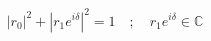 \documentclass[preview]{standalone}
\begin{document}
\begin{align*}
|r_0|^2 + |r_1 e^{i\delta}|^2 = 1 \quad ; \quad r_1 e^{i\delta} \in \mathbb{C}
\end{align*}
\end{document}
